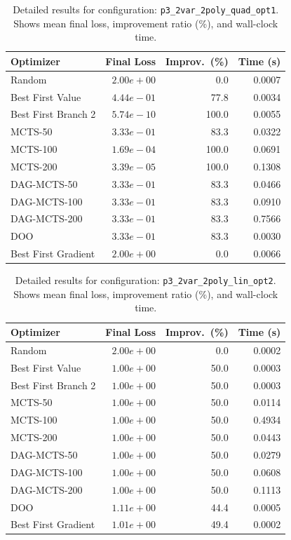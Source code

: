\begin{table}[H]
\centering
\caption{Detailed results for configuration: \texttt{p3\_2var\_2poly\_quad\_opt1}. Shows mean final loss, improvement ratio (\%), and wall-clock time.}
\label{tab:abssum-detail-18}
\begin{tabular}{lrrr}
\toprule
Optimizer & Final Loss & Improv.~(\%) & Time (s) \\
\midrule
Random & $2.00e+00$ & 0.0 & 0.0007 \\
\hline
Best First Value & $4.44e-01$ & 77.8 & 0.0034 \\
\hline
Best First Branch 2 & \textbf{$5.74e-10$} & 100.0 & 0.0055 \\
\hline
MCTS-50 & $3.33e-01$ & 83.3 & 0.0322 \\
\hline
MCTS-100 & $1.69e-04$ & 100.0 & 0.0691 \\
\hline
MCTS-200 & $3.39e-05$ & 100.0 & 0.1308 \\
\hline
DAG-MCTS-50 & $3.33e-01$ & 83.3 & 0.0466 \\
\hline
DAG-MCTS-100 & $3.33e-01$ & 83.3 & 0.0910 \\
\hline
DAG-MCTS-200 & $3.33e-01$ & 83.3 & 0.7566 \\
\hline
DOO & $3.33e-01$ & 83.3 & 0.0030 \\
\hline
Best First Gradient & $2.00e+00$ & 0.0 & 0.0066 \\
\bottomrule
\end{tabular}
\end{table}

\begin{table}[H]
\centering
\caption{Detailed results for configuration: \texttt{p3\_2var\_2poly\_lin\_opt2}. Shows mean final loss, improvement ratio (\%), and wall-clock time.}
\label{tab:abssum-detail-19}
\begin{tabular}{lrrr}
\toprule
Optimizer & Final Loss & Improv.~(\%) & Time (s) \\
\midrule
Random & $2.00e+00$ & 0.0 & 0.0002 \\
\hline
Best First Value & \textbf{$1.00e+00$} & 50.0 & 0.0003 \\
\hline
Best First Branch 2 & \textbf{$1.00e+00$} & 50.0 & 0.0003 \\
\hline
MCTS-50 & \textbf{$1.00e+00$} & 50.0 & 0.0114 \\
\hline
MCTS-100 & \textbf{$1.00e+00$} & 50.0 & 0.4934 \\
\hline
MCTS-200 & \textbf{$1.00e+00$} & 50.0 & 0.0443 \\
\hline
DAG-MCTS-50 & \textbf{$1.00e+00$} & 50.0 & 0.0279 \\
\hline
DAG-MCTS-100 & \textbf{$1.00e+00$} & 50.0 & 0.0608 \\
\hline
DAG-MCTS-200 & \textbf{$1.00e+00$} & 50.0 & 0.1113 \\
\hline
DOO & $1.11e+00$ & 44.4 & 0.0005 \\
\hline
Best First Gradient & $1.01e+00$ & 49.4 & 0.0002 \\
\bottomrule
\end{tabular}
\end{table}

